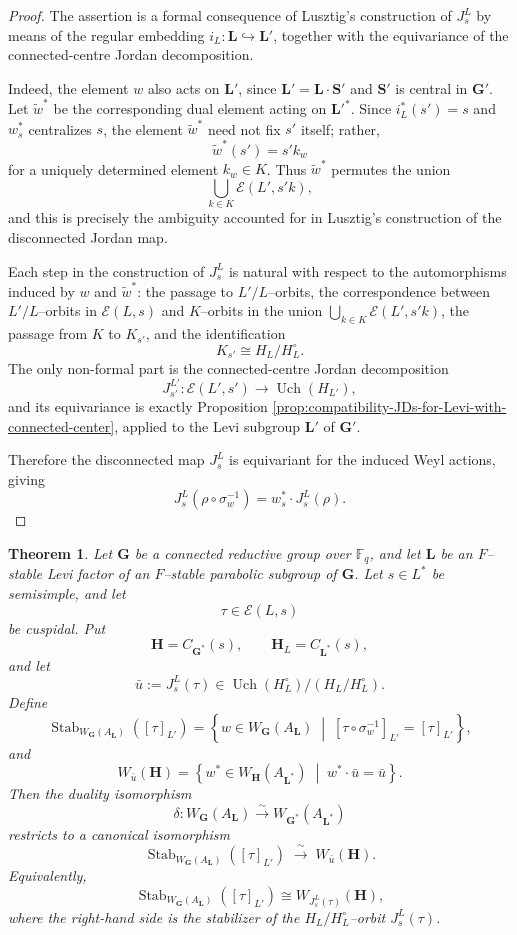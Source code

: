 \documentclass{amsart}
\theoremstyle{plain}
\numberwithin{equation}{section}
\newtheorem{theorem}{Theorem}[section]
\theoremstyle{definition}
\newcommand{\Uch}{\operatorname{Uch}}
\newcommand{\Stab}{\operatorname{Stab}}
\newcommand{\bG}{\mathbf{G}}
\newcommand{\bL}{\mathbf{L}}
\newcommand{\bH}{\mathbf{H}}
\newcommand{\bS}{\mathbf{S}}
\begin{document}
\begin{proof}
The assertion is a formal consequence of Lusztig's construction of
$J_s^L$ by means of the regular embedding $i_L:\bL\hookrightarrow \bL'$,
together with the equivariance of the connected-centre Jordan decomposition.

Indeed, the element $w$ also acts on $\bL'$, since $\bL'=\bL\cdot \bS'$ and
$\bS'$ is central in $\bG'$.  Let $\widetilde w^*$ be the corresponding
dual element acting on $\bL'^*$.  Since $i_L^*(s')=s$ and $w_s^*$ centralizes
$s$, the element $\widetilde w^*$ need not fix $s'$ itself; rather,
\[
\widetilde w^*(s')=s'k_w
\]
for a uniquely determined element $k_w\in K$.  Thus $\widetilde w^*$ permutes
the union
\[
\bigcup_{k\in K}\mathcal E(L',s'k),
\]
and this is precisely the ambiguity accounted for in Lusztig's construction
of the disconnected Jordan map.

Each step in the construction of $J_s^L$ is natural with respect to the
automorphisms induced by $w$ and $\widetilde w^*$: the passage to
$L'/L$--orbits, the correspondence between $L'/L$--orbits in
$\mathcal E(L,s)$ and $K$--orbits in the union
$\bigcup_{k\in K}\mathcal E(L',s'k)$, the passage from $K$ to $K_{s'}$, and
the identification
\[
K_{s'}\cong H_L/H_L^\circ.
\]
The only non-formal part is the connected-centre Jordan decomposition
\[
J_{s'}^{L'}:\mathcal E(L',s')\longrightarrow \Uch(H_{L'}),
\]
and its equivariance is exactly Proposition
\ref{prop:compatibility-JDs-for-Levi-with-connected-center}, applied to the
Levi subgroup $\bL'$ of $\bG'$.

Therefore the disconnected map $J_s^L$ is equivariant for the induced Weyl
actions, giving
\[
J_s^L(\rho\circ\sigma_w^{-1})
=
w_s^*\cdot J_s^L(\rho).
\]
\end{proof}

\begin{theorem}\label{thm:weyl-isom-general-levi}
Let $\bG$ be a connected reductive group over $\mathbb F_q$, and let
$\bL$ be an $F$--stable Levi factor of an $F$--stable parabolic subgroup of
$\bG$.  Let $s\in L^*$ be semisimple, and let
\[
\tau\in\mathcal E(L,s)
\]
be cuspidal.  Put
\[
\bH=C_{\bG^*}(s),\qquad
\bH_L=C_{\bL^*}(s),
\]
and let
\[
\bar u:=J_s^L(\tau)\in \Uch(H_L^\circ)/(H_L/H_L^\circ).
\]
Define
\[
\Stab_{W_{\bG}(A_{\bL})}([\tau]_{L'})
=
\left\{
w\in W_{\bG}(A_{\bL})
\;\middle|\;
[\tau\circ\sigma_w^{-1}]_{L'}=[\tau]_{L'}
\right\},
\]
and
\[
W_{\bar u}(\bH)
=
\left\{
w^*\in W_{\bH}(A_{\bL^*})
\;\middle|\;
w^*\cdot\bar u=\bar u
\right\}.
\]
Then the duality isomorphism
\[
\delta:W_{\bG}(A_{\bL})\xrightarrow{\sim}W_{\bG^*}(A_{\bL^*})
\]
restricts to a canonical isomorphism
\[
\Stab_{W_{\bG}(A_{\bL})}([\tau]_{L'})
\;\xrightarrow{\;\sim\;}\;
W_{\bar u}(\bH).
\]
Equivalently,
\[
\Stab_{W_{\bG}(A_{\bL})}([\tau]_{L'})
\cong
W_{J_s^L(\tau)}(\bH),
\]
where the right-hand side is the stabilizer of the
$H_L/H_L^\circ$--orbit \(J_s^L(\tau)\).
\end{theorem}
\end{document}
